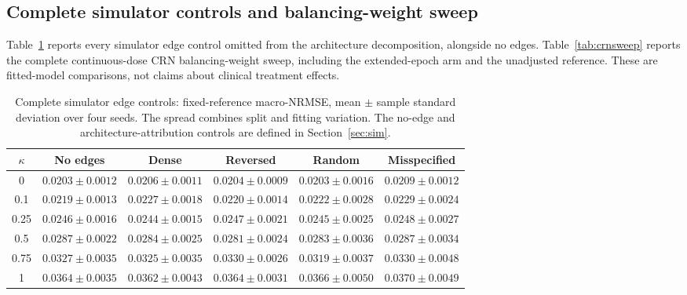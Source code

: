 \subsection{Complete simulator controls and balancing-weight sweep}
Table~\ref{tab:simall} reports every simulator edge control omitted from the architecture decomposition, alongside no edges. Table~\ref{tab:crnsweep} reports the complete continuous-dose CRN balancing-weight sweep, including the extended-epoch arm and the unadjusted reference. These are fitted-model comparisons, not claims about clinical treatment effects.
\begin{table}[tbp]
\centering
\caption{Complete simulator edge controls: fixed-reference macro-NRMSE, mean $\pm$ sample standard deviation over four seeds. The spread combines split and fitting variation. The no-edge and architecture-attribution controls are defined in Section~\ref{sec:sim}.}\label{tab:simall}
\small
\begin{tabular}{cccccc}
\toprule
$\kappa$ & No edges & Dense & Reversed & Random & Misspecified \\
\midrule
0 & $0.0203\pm0.0012$ & $0.0206\pm0.0011$ & $0.0204\pm0.0009$ & $0.0203\pm0.0016$ & $0.0209\pm0.0012$ \\ 
0.1 & $0.0219\pm0.0013$ & $0.0227\pm0.0018$ & $0.0220\pm0.0014$ & $0.0222\pm0.0028$ & $0.0229\pm0.0024$ \\ 
0.25 & $0.0246\pm0.0016$ & $0.0244\pm0.0015$ & $0.0247\pm0.0021$ & $0.0245\pm0.0025$ & $0.0248\pm0.0027$ \\ 
0.5 & $0.0287\pm0.0022$ & $0.0284\pm0.0025$ & $0.0281\pm0.0024$ & $0.0283\pm0.0036$ & $0.0287\pm0.0034$ \\ 
0.75 & $0.0327\pm0.0035$ & $0.0325\pm0.0035$ & $0.0330\pm0.0026$ & $0.0319\pm0.0037$ & $0.0330\pm0.0048$ \\ 
1 & $0.0364\pm0.0035$ & $0.0362\pm0.0043$ & $0.0364\pm0.0031$ & $0.0366\pm0.0050$ & $0.0370\pm0.0049$ \\ 
\bottomrule
\end{tabular}
\end{table}
